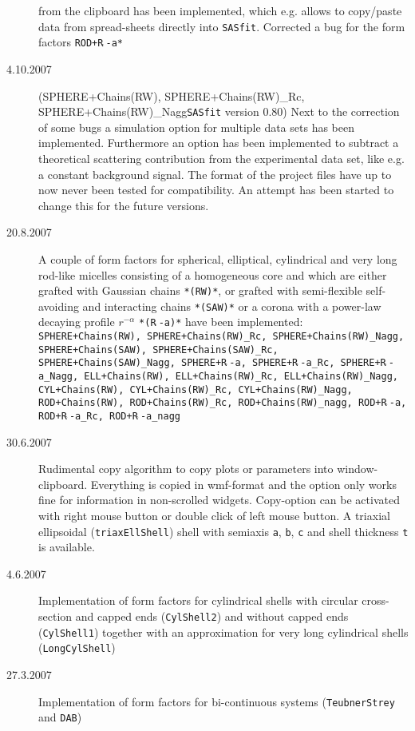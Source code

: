 \begin{description}
    from the clipboard has been implemented, which e.g. allows to copy/paste
    data from spread-sheets directly into {\tt SASfit}.
    Corrected a bug for the form factors  \texttt{ROD+R$\hat{~}$-a*}
    \item[4.10.2007] ({SPHERE+Chains(RW), SPHERE+Chains(RW)\_Rc, SPHERE+Chains(RW)\_Nagg\tt SASfit} version 0.80)
    Next to the correction of some bugs a simulation option for
    multiple data sets has been implemented. Furthermore an option has been implemented to subtract a
    theoretical scattering contribution from the experimental data set, like e.g. a constant background signal.
    The format of the project files have up to now never been tested for compatibility. An attempt has
    been started to change this for the future versions.
    \item[20.8.2007] A couple of form factors for spherical, elliptical, cylindrical and very long rod-like
    micelles consisting of a homogeneous core and which are either grafted with Gaussian chains \texttt{*(RW)*},
    or grafted with semi-flexible self-avoiding and interacting chains \texttt{*(SAW)*} or
    a corona with a power-law decaying profile $r^{-\alpha}$ \texttt{*(R$\hat{~}$-a)*}
    have been implemented:
    \texttt{
    SPHERE+Chains(RW), SPHERE+Chains(RW)\_Rc, SPHERE+Chains(RW)\_Nagg,
    SPHERE+Chains(SAW), SPHERE+Chains(SAW)\_Rc, SPHERE+Chains(SAW)\_Nagg,
    SPHERE+R$\hat{~}$-a, SPHERE+R$\hat{~}$-a\_Rc, SPHERE+R$\hat{~}$-a\_Nagg,
    ELL+Chains(RW), ELL+Chains(RW)\_Rc, ELL+Chains(RW)\_Nagg,
    CYL+Chains(RW), CYL+Chains(RW)\_Rc, CYL+Chains(RW)\_Nagg,
    ROD+Chains(RW), ROD+Chains(RW)\_Rc, ROD+Chains(RW)\_nagg,
    ROD+R$\hat{~}$-a, ROD+R$\hat{~}$-a\_Rc, ROD+R$\hat{~}$-a\_nagg
    }
    \item[30.6.2007] Rudimental copy algorithm to copy plots or parameters into window-clipboard. Everything
    is copied in wmf-format and the option only works fine for information in non-scrolled widgets.
    Copy-option can be activated with right mouse button or double click of left mouse button.
    A triaxial ellipsoidal (\texttt{triaxEllShell}) shell with semiaxis \texttt{a}, \texttt{b}, \texttt{c}
    and shell thickness \texttt{t} is available.
    \item[4.6.2007] Implementation of form factors for cylindrical shells with circular cross-section and capped ends
    (\texttt{CylShell2}) and without capped ends (\texttt{CylShell1}) together with an approximation for very long
    cylindrical shells (\texttt{LongCylShell})
    \item[27.3.2007] Implementation of form factors for bi-continuous systems (\texttt{TeubnerStrey} and \texttt{DAB})

\end{description}
